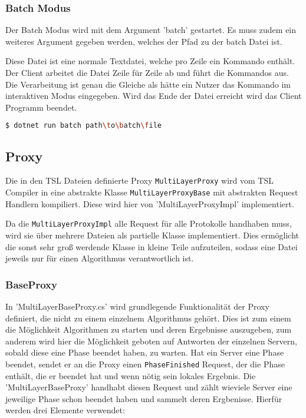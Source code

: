\subsubsection{Batch Modus}
 Der Batch Modus wird mit dem Argument 'batch' gestartet. Es muss zudem ein weiteres Argument gegeben werden, welches der Pfad zu der batch Datei ist.

 Diese Datei ist eine normale Textdatei, welche pro Zeile ein Kommando enthält. Der Client arbeitet die Datei Zeile für Zeile ab und führt die Kommandos aus.
 Die Verarbeitung ist genau die Gleiche als hätte ein Nutzer das Kommando im interaktiven Modus eingegeben. Wird das Ende der Datei erreicht wird das Client Programm beendet.

\begin{lstlisting}[language=bash]
  $ dotnet run batch path\to\batch\file 
\end{lstlisting}


\subsection{Proxy}



Die in den TSL Dateien definierte Proxy \verb|MultiLayerProxy| wird vom TSL Compiler in eine abstrakte Klasse \verb|MultiLayerProxyBase| mit abstrakten Request Handlern kompiliert. Diese wird hier von 'MultiLayerProxyImpl' implementiert.

Da die \verb|MultiLayerProxyImpl| alle Request für alle Protokolle handhaben muss, wird sie über mehrere Dateien als partielle Klasse implementiert. Dies ermöglicht die sonst sehr groß werdende Klasse in kleine Teile aufzuteilen, sodass eine Datei jeweils nur für einen Algorithmus verantwortlich ist.

\subsubsection{BaseProxy}

In 'MultiLayerBaseProxy.cs' wird grundlegende Funktionalität der Proxy definiert, die nicht zu einem einzelnem Algorithmus gehört. Dies ist zum einem die Möglichkeit Algorithmen zu starten und deren Ergebnisse auszugeben, zum anderem wird hier die Möglichkeit geboten auf Antworten der einzelnen Servern, sobald diese eine Phase beendet haben, zu warten.
Hat ein Server eine Phase beendet, sendet er an die Proxy einen \verb|PhaseFinished| Request, der die Phase enthält, die er beendet hat und wenn nötig sein lokales Ergebnis. Die 'MultiLayerBaseProxy' handhabt diesen Request und zählt wieviele Server eine jeweilige Phase schon beendet haben und sammelt deren Ergbenisse. Hierfür werden drei Elemente verwendet:

